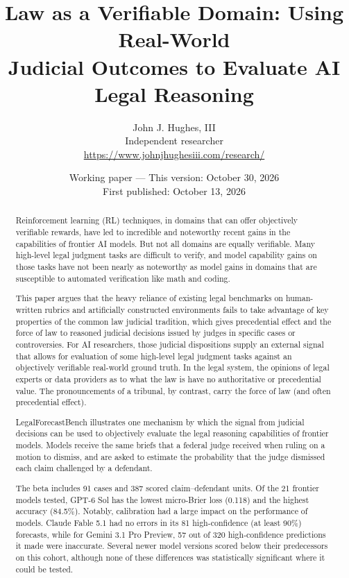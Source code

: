 \documentclass[11pt]{article}
\title{Law as a Verifiable Domain: Using Real-World\\Judicial Outcomes to Evaluate AI Legal Reasoning}
\author{John J. Hughes, III\\Independent researcher\\\url{https://www.johnjhughesiii.com/research/}}
\date{Working paper --- This version: October 30, 2026\\First published: October 13, 2026}
\begin{document}
\maketitle
\begin{abstract}
Reinforcement learning (RL) techniques, in domains that can offer objectively verifiable rewards, have led to incredible and noteworthy recent gains in the capabilities of frontier AI models. But not all domains are equally verifiable. Many high-level legal judgment tasks are difficult to verify, and model capability gains on those tasks have not been nearly as noteworthy as model gains in domains that are susceptible to automated verification like math and coding.

This paper argues that the heavy reliance of existing legal benchmarks on human-written rubrics and artificially constructed environments fails to take advantage of key properties of the common law judicial tradition, which gives precedential effect and the force of law to reasoned judicial decisions issued by judges in specific cases or controversies. For AI researchers, those judicial dispositions supply an external signal that allows for evaluation of some high-level legal judgment tasks against an objectively verifiable real-world ground truth. In the legal system, the opinions of legal experts or data providers as to what the law is have no authoritative or precedential value. The pronouncements of a tribunal, by contrast, carry the force of law (and often precedential effect).

LegalForecastBench illustrates one mechanism by which the signal from judicial decisions can be used to objectively evaluate the legal reasoning capabilities of frontier models. Models receive the same briefs that a federal judge received when ruling on a motion to dismiss, and are asked to estimate the probability that the judge dismissed each claim challenged by a defendant.

The beta includes 91 cases and 387 scored claim--defendant units. Of the 21 frontier models tested, GPT-6 Sol has the lowest micro-Brier loss (0.118) and the highest accuracy (84.5\%). Notably, calibration had a large impact on the performance of models. Claude Fable 5.1 had no errors in its 81 high-confidence (at least 90\%) forecasts, while for Gemini 3.1 Pro Preview, 57 out of 320 high-confidence predictions it made were inaccurate. Several newer model versions scored below their predecessors on this cohort, although none of these differences was statistically significant where it could be tested.
\end{abstract}
\end{document}
